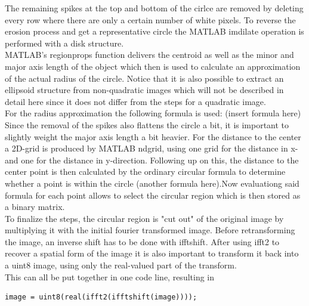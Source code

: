 \documentclass{article}
\begin{document}
The remaining spikes at the top and bottom of the cirlce are removed by deleting every row where there are only a certain number of white pixels. To reverse the erosion process and get a representative circle the MATLAB imdilate operation is performed with a disk structure. \\
MATLAB's regionprops function delivers the centroid as well as the minor and major axis length of the object which then is used to calculate an approximation of the actual radius of the circle. Notice that it is also possible to extract an ellipsoid structure from non-quadratic images which will not be described in detail here since it does not differ from the steps for a quadratic image. \\
For the radius approximation the following formula is used: (insert formula here) \\
Since the removal of the spikes also flattens the circle a bit, it is important to slightly weight the major axis length a bit heavier.  For the distance to the center a 2D-grid is produced by MATLAB ndgrid, using one grid for the distance in x- and one for the distance in y-direction. Following up on this, the distance to the center point is then calculated by the ordinary circular formula to determine whether a point is within the circle (another formula here).Now evaluationg said formula for each point allows to select the circular region which is then stored as a binary matrix. \\
To finalize the steps, the circular region is "cut out" of the original image by multiplying it with the initial fourier transformed image. Before retransforming the image, an inverse shift has to be done with ifftshift. After using ifft2 to recover a spatial form of the image it is also important to transform it back into a uint8 image, using only the real-valued part of the transform. \\
This can all be put together in one code line, resulting in
\begin{lstlisting}
image = uint8(real(ifft2(ifftshift(image))));
\end{lstlisting}

\end{document}
